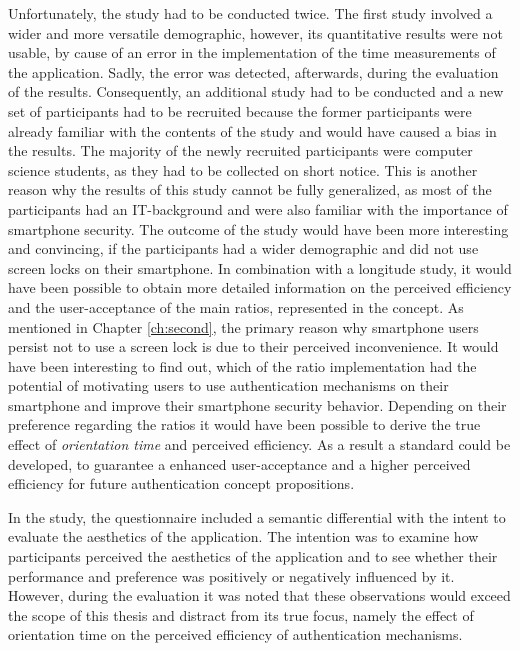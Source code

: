 Unfortunately, the study had to be conducted twice. The first study involved a wider and more versatile demographic, however, its quantitative results were not usable, by cause of an error in the implementation of the time measurements of the application. Sadly, the error was detected, afterwards, during the evaluation of the results. Consequently, an additional study had to be conducted and a new set of participants had to be recruited because the former participants were already familiar with the contents of the study and would have caused a bias in the results. The majority of the newly recruited participants were computer science students, as they had to be collected on short notice. This is another reason why the results of this study cannot be fully generalized, as most of the participants had an IT-background and were also familiar with the importance of smartphone security. The outcome of the study would have been more interesting and convincing, if the participants had a wider demographic and did not use screen locks on their smartphone. In combination with a longitude study, it would have been possible to obtain more detailed information on the perceived efficiency and the user-acceptance of the main ratios, represented in the concept. As mentioned in Chapter \ref{ch:second}, the primary reason why smartphone users persist not to use a screen lock is due to their perceived inconvenience. It would have been interesting to find out, which of the ratio implementation had the potential of motivating users to use authentication mechanisms on their smartphone and improve their smartphone security behavior. Depending on their preference regarding the ratios it would have been possible to derive the true effect of \textit{orientation time} and perceived efficiency. As a result a standard could be developed, to guarantee a enhanced user-acceptance and a higher perceived efficiency for future authentication concept propositions.

In the study, the questionnaire included a semantic differential with the intent to evaluate the aesthetics of the application. The intention was to examine how participants perceived the aesthetics of the application and to see whether their performance and preference was positively or negatively influenced by it. However, during the evaluation it was noted that these observations would exceed the scope of this thesis and distract from its true focus, namely the effect of orientation time on the perceived efficiency of authentication mechanisms.  
